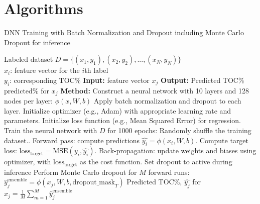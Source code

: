 \documentclass[journal abbreviation, manuscript]{copernicus}
\begin{document}
\newpage
\section{Algorithms}
\label{appendix:algorithms}
\begin{algorithm}
\caption{DNN Training with Batch Normalization and Dropout including Monte Carlo Dropout for inference}
\label{a2}
\begin{algorithmic}[1]
\REQUIRE Labeled dataset $D = \{ (x_1, y_1), (x_2, y_2), ..., (x_N, y_N)\}$ \\
\hspace{13mm} $x_i$: feature vector for the $i$th label \\
\hspace{13mm} $y_i$: corresponding TOC\%
\STATE \textbf{Input:} feature vector $x_j$
\STATE \textbf{Output:} Predicted TOC\% $\text{predicted\%}$ for $x_j$
\STATE \textbf{Method:} Construct a neural network with 10 layers and 128 nodes per layer: $\phi (x, W, b)$
\STATE Apply batch normalization and dropout to each layer.
\STATE Initialize optimizer (e.g., Adam) with appropriate learning rate and parameters.
\STATE Initialize loss function (e.g., Mean Squared Error) for regression.
\STATE Train the neural network with $D$ for 1000 epochs:
    \STATE Randomly shuffle the training dataset..
        \STATE Forward pass: compute predictions $\hat{y_i} = \phi (x_i, W, b)$.
        \STATE Compute target loss: $\text{loss}_{\text{target}} = \text{MSE} (y_i, \hat{y_i})$.
        \STATE Back-propagation: update weights and biases using optimizer, with $\text{loss}_{\text{target}}$ as the cost function.
    \ENDFOR
\ENDFOR
\STATE Set dropout to active during inference
\STATE Perform Monte Carlo dropout for $M$ forward runs:
\STATE \hspace{5mm} $\hat{y}^{\text{ensemble}}_j =  \phi (x_j, W, b, \text{dropout\_mask}_T)$
\STATE Predicted TOC\%, $\hat{y_j}$ for $x_j = \frac{1}{M}  \sum_{m=1}^{M} \hat{y}^{\text{ensemble}}_j$
\end{algorithmic}
\end{algorithm}
\end{document}
